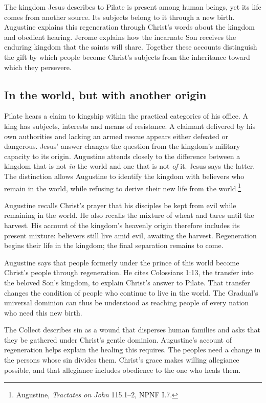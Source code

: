 The kingdom Jesus describes to Pilate is present among human beings, yet its life comes from another source. Its subjects belong to it through a new birth. Augustine explains this regeneration through Christ's words about the kingdom and obedient hearing. Jerome explains how the incarnate Son receives the enduring kingdom that the saints will share. Together these accounts distinguish the gift by which people become Christ's subjects from the inheritance toward which they persevere.

\subsection{In the world, but with another origin}
Pilate hears a claim to kingship within the practical categories of his office. A king has subjects, interests and means of resistance. A claimant delivered by his own authorities and lacking an armed rescue appears either defeated or dangerous. Jesus' answer changes the question from the kingdom's military capacity to its origin. Augustine attends closely to the difference between a kingdom that is not \emph{in} the world and one that is not \emph{of} it. Jesus says the latter. The distinction allows Augustine to identify the kingdom with believers who remain in the world, while refusing to derive their new life from the world.\footnote{Augustine, \emph{Tractates on John} 115.1--2, NPNF I.7.}

Augustine recalls Christ's prayer that his disciples be kept from evil while remaining in the world. He also recalls the mixture of wheat and tares until the harvest. His account of the kingdom's heavenly origin therefore includes its present mixture: believers still live amid evil, awaiting the harvest. Regeneration begins their life in the kingdom; the final separation remains to come.

Augustine says that people formerly under the prince of this world become Christ's people through regeneration. He cites Colossians 1:13, the transfer into the beloved Son's kingdom, to explain Christ's answer to Pilate. That transfer changes the condition of people who continue to live in the world. The Gradual's universal dominion can thus be understood as reaching people of every nation who need this new birth.

The Collect describes sin as a wound that disperses human families and asks that they be gathered under Christ's gentle dominion. Augustine's account of regeneration helps explain the healing this requires. The peoples need a change in the persons whose sin divides them. Christ's grace makes willing allegiance possible, and that allegiance includes obedience to the one who heals them.

